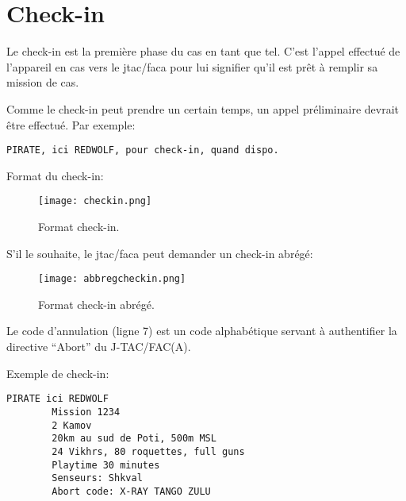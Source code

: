 \section{Check-in}

\e
	\begin{minipage}{\linewidth}
    \item
    Le check-in est la première phase du \acrshort{cas} en tant que tel. C’est l’appel effectué de l’appareil en \acrshort{cas} vers le \acrshort{jtac}/\acrshort{faca} pour lui signifier qu’il est prêt à remplir sa mission de \acrshort{cas}.
    \item Comme le check-in peut prendre un certain temps, un appel préliminaire devrait être effectué. Par exemple:
	\begin{lstlisting}[caption=Appel préliminaire, label=preliminary_call]
    PIRATE, ici REDWOLF, pour check-in, quand dispo.
	\end{lstlisting}
	\end{minipage}

	\begin{minipage}{\linewidth}
    \item Format du check-in:
    \begin{figure}[H]
        \texttt{[image: checkin.png]}
        \caption{Format check-in.}
        \label{fig:checkin}
    \end{figure}    
    \end{minipage}
    
    \begin{minipage}{\linewidth}
    \item S'il le souhaite, le \gls{jtac}/\gls{faca} peut demander un check-in abrégé:
    \begin{figure}[H]
        \texttt{[image: abbregcheckin.png]}
        \caption{Format check-in abrégé.}
        \label{fig:abbregcheckin}
    \end{figure}
    \end{minipage}
    
    \item Le code d’annulation (ligne 7) est un code alphabétique servant à authentifier la directive “Abort” du J-TAC/FAC(A).
    
    \begin{minipage}{\linewidth}
    \item Exemple de check-in:
    \begin{lstlisting}[caption=Check-in, label=checkin]
	PIRATE ici REDWOLF
    	Mission 1234
	    2 Kamov
	    20km au sud de Poti, 500m MSL
    	24 Vikhrs, 80 roquettes, full guns
	    Playtime 30 minutes
    	Senseurs: Shkval
	    Abort code: X-RAY TANGO ZULU
	\end{lstlisting}
    \end{minipage}
\ed
